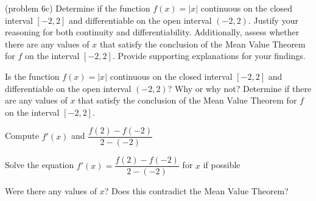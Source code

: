 \documentclass[handout]{ximera}
\begin{document}
\begin{problem}(problem 6c)
  Determine if the function $f(x) = |x|$ continuous on the closed interval $[-2,2]$ and differentiable on the open interval $(-2,2)$. 
  Justify your reasoning for both continuity and differentiability. 
  Additionally, assess whether there are any values of $x$ that satisfy the conclusion of the Mean Value Theorem for $f$ on the interval $[-2,2]$. 
  Provide supporting explanations for your findings.

  Is the function $f(x) = |x|$ continuous on the closed interval $[-2,2]$ and differentiable on the open interval $(-2,2)$? Why or why not?
  Determine if there are any values of $x$ that satisfy the conclusion of the Mean Value Theorem for $f$ on the interval $[-2,2]$.
	
    \begin{hint}
      Compute $f'(x)$ and $\dfrac{f(2) - f(-2)}{2 - (-2)}$
    \end{hint}
		\begin{hint}
		  Solve the equation $f'(x) = \dfrac{f(2) - f(-2)}{2 - (-2)}$ for $x$ if possible
		\end{hint}
		
		Were there any values of $x$? Does this contradict the Mean Value Theorem?
\end{problem}

\begin{center}
\begin{foldable}
\end{foldable}
\end{center}
\end{document}
